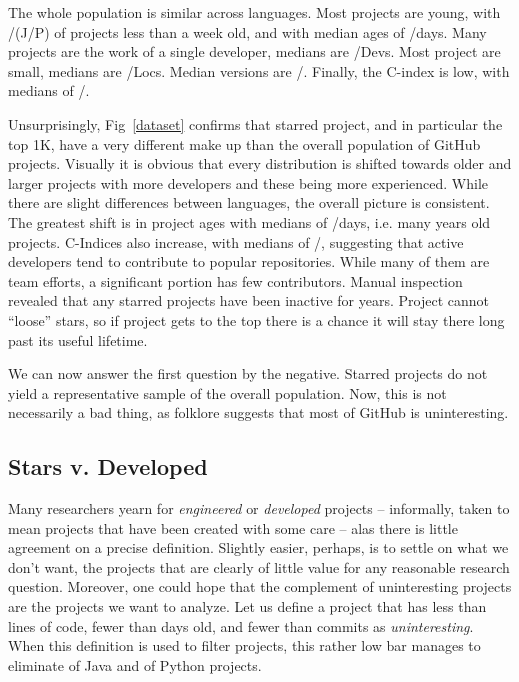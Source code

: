 \documentclass[sigconf,review,anonymous]{acmart}
\newcommand{\gh}{{GitHub}\xspace}
\begin{document}
The whole population is similar across languages. Most projects are young, with
\javaLessThanWeekPct/\pyLessThanWeekPct (J/P) of projects less than a week old,
and with median ages of \javaLifetimeMedian/\pyLifetimeMedian days. Many
projects are the work of a single developer, medians are
\javaDevsMedian/\pyDevsMedian Devs. Most project are small, medians are
\javaLOCSMedian/\pyLOCSMedian Locs. Median versions are
\javaChangesMedian/\pyChangesMedian. Finally, the C-index is low, with medians
of \javaCIndexMedian/\pyCIndexMedian.

Unsurprisingly, Fig~\ref{dataset} confirms that starred project, and in
particular the top 1K, have a very different make up than the overall population
of \gh projects. Visually it is obvious that every distribution is shifted
towards older and larger projects with more developers and these being more
experienced. While there are slight differences between languages, the overall
picture is consistent. The greatest shift is in project ages with medians of
\JavaMedianOneKStarsLifetime/\PythonMedianOneKStarsLifetime days, i.e. many
years old projects. C-Indices also increase, with medians of
\JavaMedianOneKStarsCIndex/\PythonMedianOneKStarsCIndex, suggesting that active
developers tend to contribute to popular repositories. While many of them are
team efforts, a significant portion has few contributors. Manual inspection
revealed that any starred projects have been inactive for years. Project cannot
``loose'' stars, so if project gets to the top there is a chance it will stay
there long past its useful lifetime.

We can now answer the first question by the negative. Starred projects do not
yield a representative sample of the overall population. Now, this is not
necessarily a bad thing, as folklore suggests that most of \gh is uninteresting.

\subsection{Stars v. Developed}

Many researchers yearn for \emph{engineered} \cite{mun17,pick19} or
\emph{developed} projects -- informally, taken to mean projects that have been
created with some care -- alas there is little agreement on a precise
definition. Slightly easier, perhaps, is to settle on what we don't want, the
projects that are clearly of little value for any reasonable research question.
Moreover, one could hope that the complement of uninteresting projects are the
projects we want to analyze. Let us define a project that has less than
\uninterestingLocs lines of code, fewer than \uninterestingLifetime days old,
and fewer than \uninterestingCommits commits as \emph{uninteresting}. When this
definition is used to filter projects, this rather low bar manages to eliminate
\javaUninterestingProjectsPct of Java and \pythonUninterestingProjectsPct of
Python projects.
\end{document}
